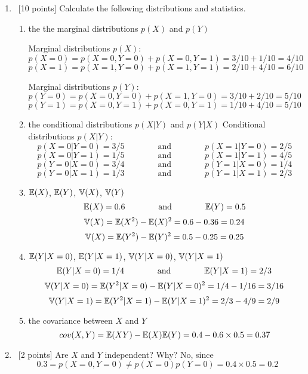 \documentclass[12pt, fullpage,letterpaper]{article}
\def\blackblue{\color{black!40!blue}}
\begin{document}
\begin{enumerate}
        \begin{enumerate}
            \item~[10 points] Calculate the following distributions and statistics. 
            \begin{enumerate}
            \item the the marginal distributions $p(X)$ and $p(Y)$
            {\blackblue             
            
            \noindent Marginal distributions $p(X)$:
            $$p(X=0) = p(X=0, Y=0) + p(X=0, Y=1) = 3/10+1/10 = 4/10$$
            $$p(X=1) = p(X=1, Y=0) + p(X=1, Y=1) = 2/10+4/10 = 6/10$$
            
            \noindent Marginal distributions $p(Y)$:
            $$p(Y=0) = p(X=0, Y=0) + p(X=1, Y=0) = 3/10+2/10 = 5/10$$
            $$p(Y=1) = p(X=0, Y=1) + p(X=0, Y=1) = 1/10+4/10 = 5/10$$
            }
            \item the conditional distributions $p(X|Y)$ and $p(Y|X)$
             {\blackblue  
             \noindent Conditional distributions $p(X|Y)$:
             $$p(X=0|Y=0) =3/5 \qquad \qquad \mbox{and}\qquad\qquad p(X=1|Y=0) = 2/5$$
             $$p(X=0|Y=1) =1/5 \qquad \qquad \mbox{and}\qquad\qquad p(X=1|Y=1) = 4/5$$
             $$p(Y=0|X=0) =3/4 \qquad \qquad \mbox{and}\qquad\qquad p(Y=1|X=0) =1/4 $$
             $$p(Y=0|X=1) =1/3 \qquad \qquad \mbox{and}\qquad\qquad p(Y=1|X=1) = 2/3$$
            }
            \item $\mathbb{E}(X)$, $\mathbb{E}(Y)$, $\mathbb{V}(X)$, $\mathbb{V}(Y)$\\
            {\blackblue  
             \noindent 
             $$\mathbb{E}(X) = 0.6  \qquad \qquad \mbox{and}\qquad\qquad  \mathbb{E}(Y) = 0.5$$
             $$\mathbb{V}(X) = \mathbb{E}(X^2) - \mathbb{E}(X)^2 = 0.6 - 0.36 = 0.24$$ 
             $$\mathbb{V}(X) = \mathbb{E}(Y^2) - \mathbb{E}(Y)^2 = 0.5 - 0.25 = 0.25$$
             }
            \item  $\mathbb{E}(Y|X=0)$, $\mathbb{E}(Y|X=1)$,  $\mathbb{V}(Y|X=0)$, $\mathbb{V}(Y|X=1)$ \\
            {\blackblue  
             \noindent 
             $$\mathbb{E}(Y|X=0) = 1/4 \qquad \qquad \mbox{and}\qquad\qquad \mathbb{E}(Y|X=1) = 2/3$$
             $$\mathbb{V}(Y|X=0) = \mathbb{E}(Y^2|X=0) - \mathbb{E}(Y|X=0)^2 = 1/4 - 1/16 = 3/16$$
             $$\mathbb{V}(Y|X=1) = \mathbb{E}(Y^2|X=1) - \mathbb{E}(Y|X=1)^2 = 2/3 - 4/9 = 2/9$$
            }
            \item  the covariance between $X$ and $Y$\\
            {\blackblue  
             \noindent 
             $$cov(X,Y) = \mathbb{E}(XY) - \mathbb{E}(X)\mathbb{E}(Y) = 0.4 - 0.6 \times 0.5 = 0.37$$ 
             }
            \end{enumerate}
            \item~[2 points] Are $X$ and $Y$ independent? Why?
            {\blackblue  
             \noindent No, since $$0.3 = p(X=0,Y=0)  \neq p(X=0)p(Y=0) = 0.4\times 0.5 = 0.2$$}
      

\end{enumerate}
\end{enumerate}
\end{document}

